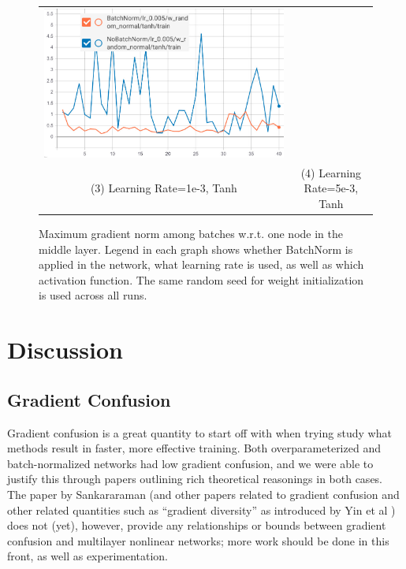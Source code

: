 \documentclass{article}
\begin{document}
\begin{figure}[h]
\begin{tabular}{cc}
  \includegraphics[scale=0.31]{pics/batchNorm/BatchNorm_tanh_5.jpg}\\
  (3) Learning Rate=1e-3, Tanh & (4) Learning Rate=5e-3, Tanh\\[6pt]
\end{tabular}
\caption{Maximum gradient norm among batches w.r.t. one node in the middle layer. Legend in each graph shows whether BatchNorm is applied in the network, what learning rate is used, as well as which activation function. The same random seed for weight initialization is used across all runs.}
\label{fig:maxgradient}
\end{figure}


\section{Discussion}
\subsection{Gradient Confusion}
Gradient confusion is a great quantity to start off with when trying study what methods result in faster, more effective training. Both overparameterized and batch-normalized networks had low gradient confusion, and we were able to justify this through papers outlining rich theoretical reasonings in both cases. The paper by Sankararaman (and other papers related to gradient confusion and other related quantities such as ``gradient diversity'' as introduced by Yin et al \cite{yin}) does not (yet), however, provide any relationships or bounds between gradient confusion and multilayer nonlinear networks; more work should be done in this front, as well as experimentation.
\end{document}

